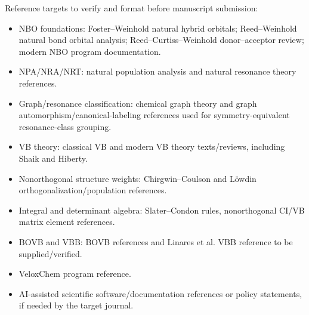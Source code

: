\documentclass[11pt]{article}
\begin{document}
Reference targets to verify and format before manuscript submission:
\begin{itemize}[leftmargin=*]
	\item NBO foundations: Foster--Weinhold natural hybrid orbitals; Reed--Weinhold natural bond orbital analysis; Reed--Curtiss--Weinhold donor--acceptor review; modern NBO program documentation.
	\item NPA/NRA/NRT: natural population analysis and natural resonance theory references.
	\item Graph/resonance classification: chemical graph theory and graph automorphism/canonical-labeling references used for symmetry-equivalent resonance-class grouping.
	\item VB theory: classical VB and modern VB theory texts/reviews, including Shaik and Hiberty.
	\item Nonorthogonal structure weights: Chirgwin--Coulson and L\"owdin orthogonalization/population references.
	\item Integral and determinant algebra: Slater--Condon rules, nonorthogonal CI/VB matrix element references.
	\item BOVB and VBB: BOVB references and Linares et al. VBB reference to be supplied/verified.
	\item VeloxChem program reference.
	\item AI-assisted scientific software/documentation references or policy statements, if needed by the target journal.
\end{itemize}
\end{document}
